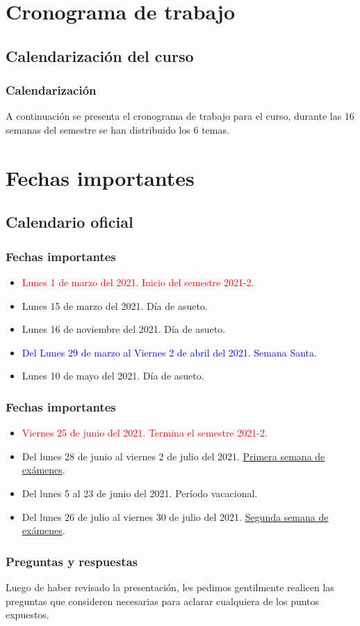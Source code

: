 \section{Cronograma de trabajo}
\subsection{Calendarización del curso}
\begin{frame}
\frametitle{Calendarización}
A continuación se presenta el cronograma de trabajo para el curso, durante las 16 semanas del semestre se han distribuido los 6 temas.
\end{frame}
{

}

\section{Fechas importantes}
\subsection{Calendario oficial}

\begin{frame}
\frametitle{Fechas importantes}
\fontsize{12}{12}\selectfont
\begin{itemize}
\item \textcolor{red}{Lunes 1 de marzo del 2021. Inicio del semestre 2021-2.}
\item Lunes 15 de marzo del 2021. Día de asueto.
\item Lunes 16 de noviembre del 2021. Día de asueto.
\item \textcolor{blue}{Del Lunes 29 de marzo al Viernes 2 de abril del 2021. Semana Santa.}
\item Lunes 10 de mayo del 2021. Día de asueto.
\end{itemize}
\end{frame}
\begin{frame}
\frametitle{Fechas importantes}
\fontsize{12}{12}\selectfont
\begin{itemize}
\item \textcolor{red}{Viernes 25 de junio del 2021. Termina el semestre 2021-2.}
\item Del lunes 28 de junio al viernes 2 de julio del 2021. \underline{Primera semana de exámenes}.
\item Del lunes 5 al 23 de junio del 2021. Período vacacional.
\item Del lunes 26 de julio al viernes 30 de julio del 2021. \underline{Segunda semana de exámenes}.
\end{itemize}
\end{frame}
\begin{frame}
\frametitle{Preguntas y respuestas}
Luego de haber revisado la presentación, les pedimos gentilmente realicen las preguntas que consideren necesarias para aclarar cualquiera de los puntos expuestos.
\end{frame}
